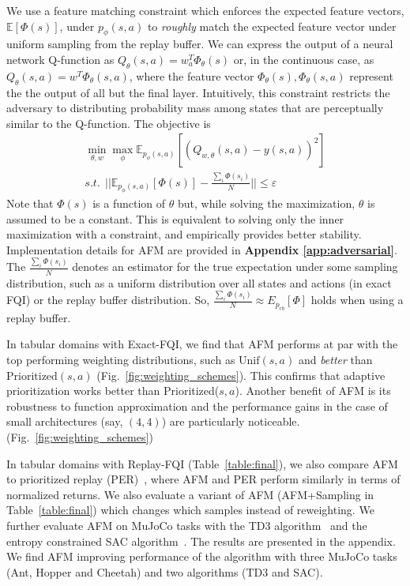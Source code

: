 We use a feature matching constraint which enforces the expected feature vectors, $\mathbb{E}[\Phi(s)]$, under $p_\phi(s, a)$ to \emph{roughly} match the expected feature vector under uniform sampling from the replay buffer. We can express the output of a neural network Q-function as $Q_\theta(s, a) = w_{a}^T \Phi_\theta(s)$ or, in the continuous case, as $Q_\theta(s, a) = w^T \Phi_\theta(s, a)$,  where the feature vector $\Phi_\theta(s), \Phi_\theta(s, a)$ represent the the output of all but the final layer.
Intuitively, this constraint restricts the adversary to distributing probability mass among states that are perceptually similar to the Q-function. The objective is
\begin{multline*}
    \min_{\theta, w} \max_{\phi} \mathbb{E}_{p_\phi(s, a)} [(Q_{w, \theta} (s, a) - y(s, a))^2]\\
s.t.~~ \vert\vert \mathbb{E}_{p_\phi(s, a)}[\Phi(s)] - \frac{\sum_i \Phi(s_i)}{N} \vert\vert \leq \varepsilon
\end{multline*}
Note that $\Phi(s)$ is a function of $\theta$ but, while solving the maximization, $\theta$ is assumed to be a constant. This is equivalent to solving only the inner maximization with a constraint, and empirically provides better stability. Implementation details for AFM are provided in \textbf{Appendix \ref{app:adversarial}}. The $\frac{\sum_{i} \Phi(s_i)}{N}$ denotes an estimator for the true expectation under some sampling distribution, such as a uniform distribution over all states and actions (in exact FQI) or the replay buffer distribution. So, $\frac{\sum_{i} \Phi(s_i)}{N} \approx E_{p_{rb}}[\Phi]$ holds when using a replay buffer.

In tabular domains with Exact-FQI, we find that AFM performs at par with the top performing weighting distributions, such as $\text{Unif}(s, a)$ and \textit{better} than $\text{Prioritized}(s, a)$ (Fig.~\ref{fig:weighting_schemes}). This confirms that adaptive prioritization works better than Prioritized($s, a$). Another benefit of AFM is its robustness to function approximation and the performance gains in the case of small architectures (say, $(4, 4)$) are particularly noticeable. (Fig.~\ref{fig:weighting_schemes})

In tabular domains with Replay-FQI (Table~\ref{table:final}), we also compare AFM to prioritized replay (PER)~\citep{Schaul2015}, where AFM and PER perform similarly in terms of normalized returns. We also evaluate a variant of AFM (AFM+Sampling in Table~\ref{table:final}) which changes which samples instead of reweighting. We further evaluate AFM on MuJoCo tasks with the TD3 algorithm~\citep{pmlr-v80-fujimoto18a} and the entropy constrained SAC algorithm~\citep{Haarnoja18}. The results are presented in the appendix. We find AFM improving performance of the algorithm with three MuJoCo tasks (Ant, Hopper and Cheetah) and two algorithms (TD3 and SAC).

